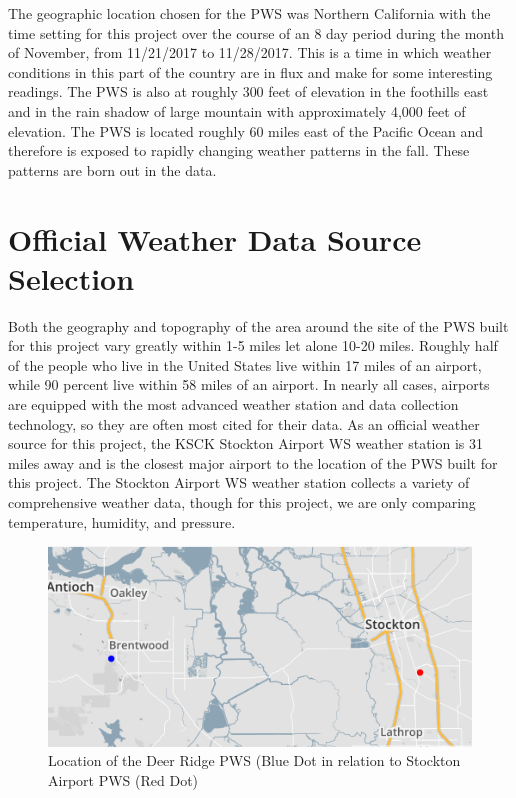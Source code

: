 \documentclass[sigconf]{acmart}
\begin{document}
The geographic location chosen for the PWS was Northern California with the time setting for this project over the course of an 8 day period during the month of November, from 11/21/2017 to 11/28/2017. This is a time in which weather conditions in this part of the country are in flux and make for some interesting readings. The PWS is also at roughly 300 feet of elevation in the foothills east and in the rain shadow of large mountain with approximately 4,000 feet of elevation. The PWS is located roughly 60 miles east of the Pacific Ocean and therefore is exposed to rapidly changing weather patterns in the fall. These patterns are born out in the data.

\section{Official Weather Data Source Selection}

Both the geography and topography of the area around the site of the PWS built for this project vary greatly within 1-5 miles let alone 10-20 miles. Roughly half of the people who live in the United States live within 17 miles of an airport, while 90 percent live within 58 miles of an airport.\cite{Pearson2017} In nearly all cases, airports are equipped with the most advanced weather station and data collection technology, so they are often most cited for their data. As an official weather source for this project, the KSCK Stockton Airport WS weather station is 31 miles away and is the closest major airport to the location of the PWS built for this project. The Stockton Airport WS weather station collects a variety of comprehensive weather data, though for this project, we are only comparing temperature, humidity, and pressure. 

\begin{figure}[H]
    \centering
    \includegraphics[scale=.40]{DR_Stockton.PNG}
    \caption{Location of the Deer Ridge PWS (Blue Dot in relation to Stockton Airport PWS (Red Dot)}
    \label{Image 1: Deer Ridge}
\end{figure}
\end{document}

